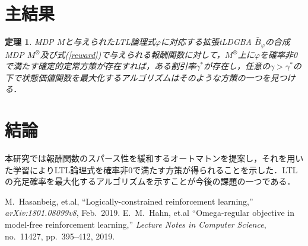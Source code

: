 \documentclass[a4j,9pt,twocolumn]{jsarticle}
\newtheorem{theorem}{定理}
\theoremstyle{definition}
\begin{document}
\section{主結果}
\begin{theorem}
  MDP $M$と与えられたLTL論理式$\varphi$に対応する拡張tLDGBA $\bar{B}_{\varphi}$の合成MDP $M^{\otimes}$及び式(\ref{reward})で与えられる報酬関数に対して，$M^{\otimes}$上に$\varphi$を確率非0で満たす確定的定常方策が存在すれば，ある割引率$\gamma^{\ast}$が存在し，任意の$\gamma>\gamma^{\ast}$の下で状態価値関数を最大化するアルゴリズムはそのような方策の一つを見つける．
\end{theorem}

\section{結論}
本研究では報酬関数のスパース性を緩和するオートマトンを提案し，それを用いた学習によりLTL論理式を確率非0で満たす方策が得られることを示した．LTLの充足確率を最大化するアルゴリズムを示すことが今後の課題の一つである．

\begin{thebibliography}{9}
  M.\ Hasanbeig, et.al,
  ``Logically-constrained reinforcement learning,'' \textit{arXiv:1801.08099v8}, Feb.\ 2019.
  E.\ M.\ Hahn, et.al
  ``Omega-regular objective in model-free reinforcement learning,''
  \textit{Lecture Notes in Computer Science}, no.\ 11427, pp.\ 395--412, 2019.
\end{thebibliography}
\newpage
\pagebreak
\end{document}

